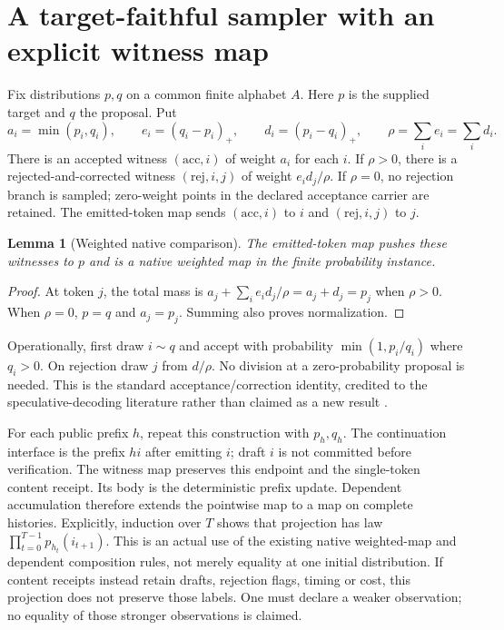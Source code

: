 \documentclass[11pt]{article}
\newtheorem{lemma}{Lemma}
\begin{document}
\section{A target-faithful sampler with an explicit witness map}
Fix distributions $p,q$ on a common finite alphabet $A$. Here $p$ is the supplied
target and $q$ the proposal. Put
\[
 a_i=\min(p_i,q_i),\qquad e_i=(q_i-p_i)_+,\qquad
 d_i=(p_i-q_i)_+,\qquad \rho=\sum_i e_i=\sum_i d_i.
\]
There is an accepted witness $(\mathrm{acc},i)$ of weight $a_i$ for each $i$.
If $\rho>0$, there is a rejected-and-corrected witness $(\mathrm{rej},i,j)$
of weight $e_i d_j/\rho$. If $\rho=0$, no rejection branch is sampled;
zero-weight points in the declared acceptance carrier are retained.
The emitted-token map sends $(\mathrm{acc},i)$ to $i$ and
$(\mathrm{rej},i,j)$ to $j$.

\begin{lemma}[Weighted native comparison]
The emitted-token map pushes these witnesses to $p$ and is a native weighted
map in the finite probability instance.
\end{lemma}
\begin{proof}
At token $j$, the total mass is
$a_j+\sum_i e_i d_j/\rho=a_j+d_j=p_j$ when $\rho>0$.
When $\rho=0$, $p=q$ and $a_j=p_j$. Summing also proves normalization.
\end{proof}

Operationally, first draw $i\sim q$ and accept with probability
$\min(1,p_i/q_i)$ where $q_i>0$. On rejection draw $j$ from $d/\rho$.
No division at a zero-probability proposal is needed. This is the standard
acceptance/correction identity, credited to the speculative-decoding literature
rather than claimed as a new result \cite{leviathan}.

For each public prefix $h$, repeat this construction with $p_h,q_h$. The
continuation interface is the prefix $hi$ after emitting $i$; draft $i$ is not
committed before verification. The witness map preserves this endpoint and the
single-token content receipt. Its body is the deterministic prefix update.
Dependent accumulation therefore extends the pointwise map to a map on complete
histories. Explicitly, induction over $T$ shows that projection has law
$\prod_{t=0}^{T-1}p_{h_t}(i_{t+1})$.
This is an actual use of the existing native weighted-map and dependent
composition rules, not merely equality at one initial distribution.
If content receipts instead retain drafts, rejection flags, timing or cost,
this projection does not preserve those labels. One must declare a weaker
observation; no equality of those stronger observations is claimed.
\end{document}

